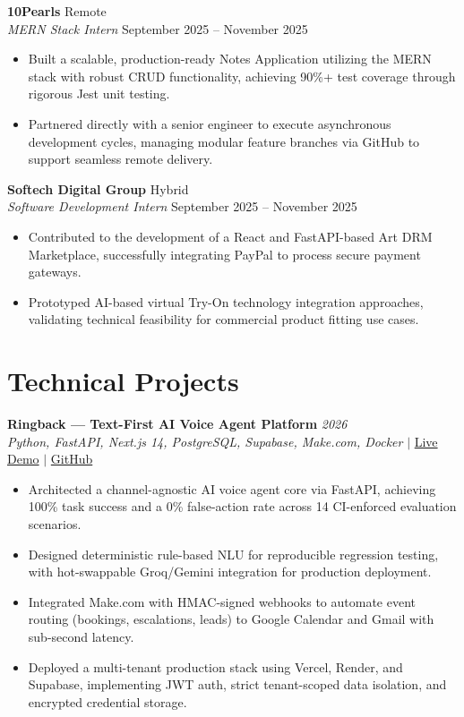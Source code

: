 \documentclass[11pt, a4paper]{article}
\begin{document}
\textbf{10Pearls} \hfill Remote \\
\textit{MERN Stack Intern} \hfill September 2025 -- November 2025
\begin{itemize}[leftmargin=0.25in, itemsep=2pt]
    \item Built a scalable, production-ready Notes Application utilizing the MERN stack with robust CRUD functionality, achieving 90\%+ test coverage through rigorous Jest unit testing.
    \item Partnered directly with a senior engineer to execute asynchronous development cycles, managing modular feature branches via GitHub to support seamless remote delivery.
\end{itemize}

\textbf{Softech Digital Group} \hfill Hybrid \\
\textit{Software Development Intern} \hfill September 2025 -- November 2025
\begin{itemize}[leftmargin=0.25in, itemsep=2pt]
    \item Contributed to the development of a React and FastAPI-based Art DRM Marketplace, successfully integrating PayPal to process secure payment gateways.
    \item Prototyped AI-based virtual Try-On technology integration approaches, validating technical feasibility for commercial product fitting use cases.
\end{itemize}

\section*{Technical Projects}

\textbf{Ringback — Text-First AI Voice Agent Platform} \hfill \textit{2026} \\
\textit{Python, FastAPI, Next.js 14, PostgreSQL, Supabase, Make.com, Docker} $|$ \href{https://ringback-web.vercel.app/}{Live Demo} $|$ \href{https://github.com/SShayanHussain/ringback}{GitHub}
\begin{itemize}[leftmargin=0.25in, itemsep=2pt]
    \item Architected a channel-agnostic AI voice agent core via FastAPI, achieving 100\% task success and a 0\% false-action rate across 14 CI-enforced evaluation scenarios.
    \item Designed deterministic rule-based NLU for reproducible regression testing, with hot-swappable Groq/Gemini integration for production deployment.
    \item Integrated Make.com with HMAC-signed webhooks to automate event routing (bookings, escalations, leads) to Google Calendar and Gmail with sub-second latency.
    \item Deployed a multi-tenant production stack using Vercel, Render, and Supabase, implementing JWT auth, strict tenant-scoped data isolation, and encrypted credential storage.
\end{itemize}
\end{document}
